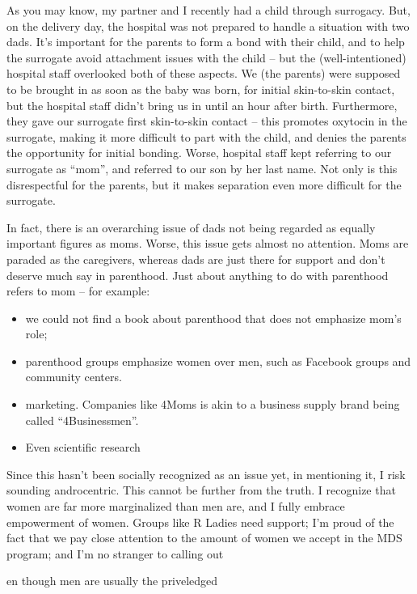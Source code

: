 \documentclass[]{book}
\providecommand{\tightlist}{%
  \setlength{\itemsep}{0pt}\setlength{\parskip}{0pt}}
\begin{document}
As you may know, my partner and I recently had a child through surrogacy. But, on the delivery day, the hospital was not prepared to handle a situation with two dads. It's important for the parents to form a bond with their child, and to help the surrogate avoid attachment issues with the child -- but the (well-intentioned) hospital staff overlooked both of these aspects. We (the parents) were supposed to be brought in as soon as the baby was born, for initial skin-to-skin contact, but the hospital staff didn't bring us in until an hour after birth. Furthermore, they gave our surrogate first skin-to-skin contact -- this promotes oxytocin in the surrogate, making it more difficult to part with the child, and denies the parents the opportunity for initial bonding. Worse, hospital staff kept referring to our surrogate as ``mom'', and referred to our son by her last name. Not only is this disrespectful for the parents, but it makes separation even more difficult for the surrogate.

In fact, there is an overarching issue of dads not being regarded as equally important figures as moms. Worse, this issue gets almost no attention. Moms are paraded as the caregivers, whereas dads are just there for support and don't deserve much say in parenthood. Just about anything to do with parenthood refers to mom -- for example:

\begin{itemize}
\tightlist
\item
  we could not find a book about parenthood that does not emphasize mom's role;
\item
  parenthood groups emphasize women over men, such as Facebook groups and community centers.
\item
  marketing. Companies like 4Moms is akin to a business supply brand being called ``4Businessmen''.
\item
  Even scientific research
\end{itemize}

Since this hasn't been socially recognized as an issue yet, in mentioning it, I risk sounding androcentric. This cannot be further from the truth. I recognize that women are far more marginalized than men are, and I fully embrace empowerment of women. Groups like R Ladies need support; I'm proud of the fact that we pay close attention to the amount of women we accept in the MDS program; and I'm no stranger to calling out

en though men are usually the priveledged
\end{document}
